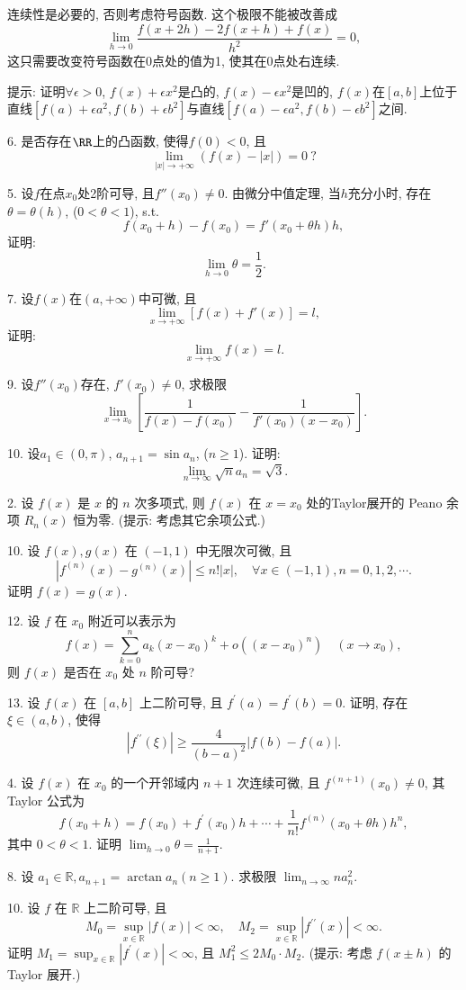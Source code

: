 连续性是必要的, 否则考虑符号函数. 这个极限不能被改善成
\[
\lim_{h\to0}\frac{f(x+2h)-2f(x+h)+f(x)}{h^{2}}=0,
\]
这只需要改变符号函数在0点处的值为1, 使其在0点处右连续.

提示: 证明$\forall\epsilon>0$, $f(x)+\epsilon x^{2}$是凸的, $f(x)-\epsilon x^{2}$是凹的,
$f(x)$在$[a,b]$上位于直线$[f(a)+\epsilon a^{2},f(b)+\epsilon b^{2}]$与直线$[f(a)-\epsilon a^{2},f(b)-\epsilon b^{2}]$之间.

6. 是否存在$\RR$上的凸函数, 使得$f(0)<0$, 且
\[
\lim_{\left|x\right|\to+\infty}(f(x)-\left|x\right|)=0\ ?
\]

5. 设$f$在点$x_{0}$处2阶可导, 且$f''(x_{0})\ne0$. 由微分中值定理, 当$h$充分小时, 存在$\theta=\theta(h)$,
($0<\theta<1$), s.t.
\[
f(x_{0}+h)-f(x_{0})=f'(x_{0}+\theta h)h,
\]
证明:
\[
\lim_{h\to0}\theta=\frac{1}{2}.
\]

7. 设$f(x)$在$(a,+\infty)$中可微, 且
\[
\lim_{x\to+\infty}\left[f(x)+f'(x)\right]=l,
\]
证明:
\[
\lim_{x\to+\infty}f(x)=l.
\]

9. 设$f''(x_{0})$存在, $f'(x_{0})\ne0$, 求极限
\[
\lim_{x\to x_{0}}\left[\frac{1}{f(x)-f(x_{0})}-\frac{1}{f'(x_{0})(x-x_{0})}\right].
\]

10. 设$a_{1}\in(0,\pi)$, $a_{n+1}=\sin a_{n}$, ($n\ge1$). 证明:
\[
\lim_{n\to\infty}\sqrt{n}a_{n}=\sqrt{3}.
\]

2. 设 $f(x)$ 是 $x$ 的 $n$ 次多项式, 则 $f(x)$ 在 $x=x_{0}$ 处的Taylor展开的
Peano 余项 $R_{n}(x)$ 恒为零. (提示: 考虑其它余项公式.)

10. 设 $f(x),g(x)$ 在 $(-1,1)$ 中无限次可微, 且 
\[
\left|f^{(n)}(x)-g^{(n)}(x)\right|\le n!|x|,\quad\forall x\in(-1,1),n=0,1,2,\cdots.
\]
证明 $f(x)=g(x)$.

12. 设 $f$ 在 $x_{0}$ 附近可以表示为 
\[
f(x)=\sum_{k=0}^{n}a_{k}\left(x-x_{0}\right)^{k}+o\left(\left(x-x_{0}\right)^{n}\right)\quad\left(x\rightarrow x_{0}\right),
\]
则 $f(x)$ 是否在 $x_{0}$ 处 $n$ 阶可导? 

13. 设 $f(x)$ 在 $[a,b]$ 上二阶可导, 且 $f^{\prime}(a)=f^{\prime}(b)=0$.
证明, 存在 $\xi\in(a,b)$, 使得
\[
\left|f^{\prime\prime}(\xi)\right|\ge\frac{4}{(b-a)^{2}}|f(b)-f(a)|.
\]

4. 设 $f(x)$ 在 $x_{0}$ 的一个开邻域内 $n+1$ 次连续可微, 且 $f^{(n+1)}\left(x_{0}\right)\neq0$,
其 Taylor 公式为 
\[
f\left(x_{0}+h\right)=f\left(x_{0}\right)+f^{\prime}\left(x_{0}\right)h+\cdots+\frac{1}{n!}f^{(n)}\left(x_{0}+\theta h\right)h^{n},
\]
其中 $0<\theta<1$. 证明 $\lim_{h\rightarrow0}\theta=\frac{1}{n+1}$.

8. 设 $a_{1}\in\mathbb{R},a_{n+1}=\arctan a_{n}(n\geqslant1)$. 求极限
$\lim_{n\rightarrow\infty}na_{n}^{2}$.

10. 设 $f$ 在 $\mathbb{R}$ 上二阶可导, 且 
\[
M_{0}=\sup_{x\in\mathbb{R}}|f(x)|<\infty,\quad M_{2}=\sup_{x\in\mathbb{R}}\left|f^{\prime\prime}(x)\right|<\infty.
\]
证明 $M_{1}=\sup_{x\in\mathbb{R}}\left|f^{\prime}(x)\right|<\infty$,
且 $M_{1}^{2}\leqslant2M_{0}\cdot M_{2}$. (提示: 考虑 $f(x\pm h)$ 的 Taylor
展开.)

